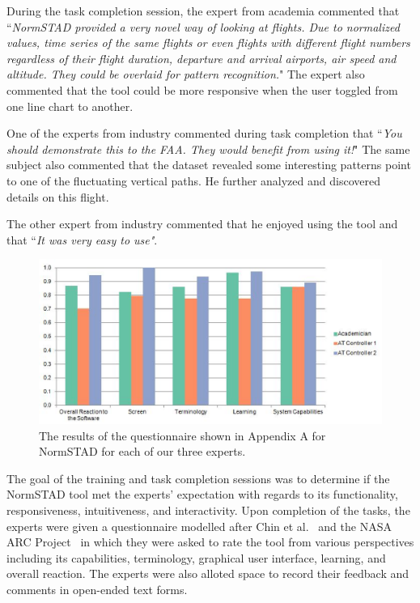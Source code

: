 \documentclass{sig-alternate}
\begin{document}
During the task completion session, the expert from academia
commented that ``\emph{NormSTAD provided a very novel way of looking
at flights. Due to normalized values, time series of the same flights
or even flights with different flight numbers regardless of their 
flight duration, departure and arrival airports, air speed and altitude.
They could be overlaid for pattern recognition.}" The expert
also commented that the tool could be more responsive when the user 
toggled from one line chart to another.

One of the experts from industry commented during 
task completion that ``\emph{You should 
demonstrate this to the FAA. They would benefit from using it!}"
The same subject also commented that the dataset revealed some 
interesting patterns point to one of the fluctuating vertical
paths. He further analyzed and discovered details on this 
flight.

The other expert from industry commented that he enjoyed
using the tool and that ``\emph{It was very easy to use"}. 

\begin{figure}
\centering
\includegraphics[width=\columnwidth]{figs/review.eps}
\caption{
The results of the questionnaire shown in Appendix A
for NormSTAD for each of our three experts.}
\label{review}
\end{figure}


The goal of the training and task completion sessions was to determine if the NormSTAD tool met
the experts' expectation with regards to its functionality,
responsiveness, intuitiveness, and interactivity. Upon completion of the tasks, the experts were
given a questionnaire modelled after Chin et al.~\cite{Chin88} and the 
NASA ARC Project~\cite{NASA}
 in which they were asked to rate the tool from various perspectives
including its capabilities, terminology, graphical user interface, learning, and
overall reaction. The experts were also alloted space to record their feedback
and comments in open-ended text forms.
\end{document}
